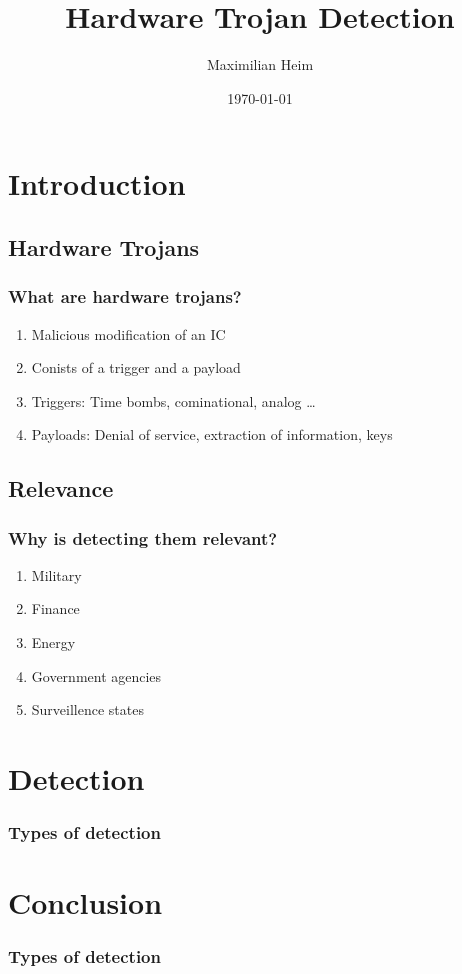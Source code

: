 \documentclass[11pt]{beamer}
\author{Maximilian Heim}
\title{Hardware Trojan Detection}
\institute{University Albstadt-Sigmaringen}
\date{\today}
\begin{document}
\begin{frame}
\titlepage
\end{frame}

\begin{frame}
\tableofcontents
\end{frame}

\section{Introduction}
\subsection{Hardware Trojans}
\begin{frame}
    \frametitle{What are hardware trojans?}
    \begin{enumerate}
    \item Malicious modification of an IC
    \item Conists of a trigger and a payload
    \item Triggers: Time bombs, cominational, analog \dots
    \item Payloads: Denial of service, extraction of information, keys
    \end{enumerate}
\end{frame}
\subsection{Relevance}
\begin{frame}
    \frametitle{Why is detecting them relevant?}
    \begin{enumerate}
    \item Military
    \item Finance
    \item Energy
    \item Government agencies
    \item Surveillence states
    \end{enumerate}

\end{frame}


\section{Detection}
\begin{frame}
    \frametitle{Types of detection}
\end{frame}

\section{Conclusion}
\begin{frame}
    \frametitle{Types of detection}
\end{frame}
\end{document}
